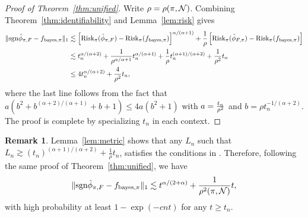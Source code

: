\documentclass[11pt]{article}
\theoremstyle{plain}
\theoremstyle{definition}
\newtheorem{rmk}{Remark}
\def\sign{\textup{sgn}}
\def\bayespif{f_{\textup{bayes},\pi}}
\def\risk{\textup{Risk}_\pi}
\begin{document}
\begin{proof}[Proof of Theorem~\ref{thm:unified}]
Write $\rho=\rho(\pi,\mathcal{N})$. Combining Theorem~\ref{thm:identifiability} and Lemma~\ref{lem:risk} gives
\begin{align}
\onenormSize{}{\sign \hat\phi_{\pi,F}-\bayespif} &\lesssim \left[\risk(\hat \phi_{\pi,F})-\risk(\bayespif)\right]^{\alpha/(\alpha+1)}+{1\over \rho}\left[\risk(\hat \phi_{F,\pi})-\risk(\bayespif)\right]\\
&\lesssim t_n^{\alpha/(\alpha+2)}+{1\over \rho^{\alpha/\alpha+1}}t_n^{\alpha/(\alpha+1)}+{1\over \rho}t_n^{(\alpha+1)/(\alpha+2)}+{1\over \rho^2}t_n\notag \\
&\leq 4t_n^{\alpha/(\alpha+2)}+{4\over \rho^2}t_n,
\end{align}
where the last line follows from the fact that $a(b^2+b^{(\alpha+2)/(\alpha+1)}+b+1) \leq 4 a (b^2+1)$ with $a={t_n \over \rho^2}$ and $b=\rho t_n^{-1/(\alpha+2)}$. The proof is complete by specializing $t_n$ in each context. 
\end{proof}

\begin{rmk}\label{rmk:lt}
Lemma~\ref{lem:metric} shows that  any  $L_n$ such that $L_n\gtrsim (t_n)^{(\alpha+1)/(\alpha+2)} +\frac{1}{\rho}t_n$,  satisfies the conditions in \citet[Theorem 3]{shen1994convergence}.  Therefore, following the same proof of Theorem~\ref{thm:unified}, we have
\begin{equation}\label{eq:unified_sign}
\onenormSize{}{\sign \hat \phi_{\pi,F}-\bayespif}\lesssim t^{\alpha/( 2+\alpha)}+{1\over \rho^2(\pi,\tN)}t,
\end{equation}
with high probability at least $1-\exp(-cnt)$ for any $t\geq t_n$.
\end{rmk}
\end{document}
